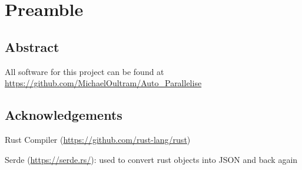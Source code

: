 \chapter{Preamble}
\section{Abstract}

All software for this project can be found at \url{https://github.com/MichaelOultram/Auto\_Parallelise}

\section{Acknowledgements}
Rust Compiler (\url{https://github.com/rust-lang/rust})

Serde (\url{https://serde.rs/}): used to convert rust objects into JSON and back again
